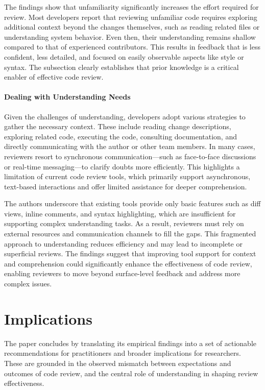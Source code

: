 The findings show that unfamiliarity significantly increases the effort required for review. Most developers report that reviewing unfamiliar code requires exploring additional context beyond the changes themselves, such as reading related files or understanding system behavior. Even then, their understanding remains shallow compared to that of experienced contributors. This results in feedback that is less confident, less detailed, and focused on easily observable aspects like style or syntax. The subsection clearly establishes that prior knowledge is a critical enabler of effective code review.

\paragraph{Dealing with Understanding Needs}
Given the challenges of understanding, developers adopt various strategies to gather the necessary context. These include reading change descriptions, exploring related code, executing the code, consulting documentation, and directly communicating with the author or other team members. In many cases, reviewers resort to synchronous communication—such as face-to-face discussions or real-time messaging—to clarify doubts more efficiently. This highlights a limitation of current code review tools, which primarily support asynchronous, text-based interactions and offer limited assistance for deeper comprehension.

The authors underscore that existing tools provide only basic features such as diff views, inline comments, and syntax highlighting, which are insufficient for supporting complex understanding tasks. As a result, reviewers must rely on external resources and communication channels to fill the gaps. This fragmented approach to understanding reduces efficiency and may lead to incomplete or superficial reviews. The findings suggest that improving tool support for context and comprehension could significantly enhance the effectiveness of code review, enabling reviewers to move beyond surface-level feedback and address more complex issues.

\section{Implications}
The paper concludes by translating its empirical findings into a set of actionable recommendations for practitioners and broader implications for researchers. These are grounded in the observed mismatch between expectations and outcomes of code review, and the central role of understanding in shaping review effectiveness.

